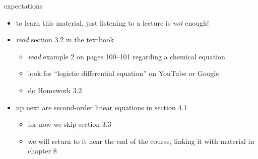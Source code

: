 \documentclass[colorlinks]{beamer}
\begin{document}
\begin{frame}{expectations}

\begin{itemize}
\item to learn this material, just listening to a lecture is \emph{not} enough!
\item \emph{read} section 3.2 in the textbook
    \begin{itemize}
    \item \emph{read} example 2 on pages 100--101 regarding a chemical equation
    \item look for ``logistic differential equation'' on YouTube or Google
    \item do Homework 3.2
    \end{itemize}
\item up next are second-order linear equations in section 4.1
    \begin{itemize}
    \item for now we skip section 3.3
    \item we will return to it near the end of the course, linking it with material in chapter 8
    \end{itemize}
\end{itemize}
\end{frame}
\end{document}
